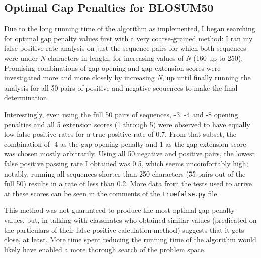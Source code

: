 \documentclass{article}
\begin{document}
\subsection{Optimal Gap Penalties for BLOSUM50}
Due to the long running time of the algorithm as implemented, I began searching for optimal gap penalty values first with a very coarse-grained method: I ran my false positive rate analysis on just the sequence pairs for which both sequences were under {\it N} characters in length, for increasing values of {\it N} (160 up to 250). Promising combinations of gap opening and gap extension scores were investigated more and more closely by increasing {\it N}, up until finally running the analysis for all 50 pairs of positive and negative sequences to make the final determination. 
\par Interestingly, even using the full 50 pairs of sequences, -3, -4 and -8 opening penalties and all 5 extension scores (1 through 5) were observed to have equally low false positive rates for a true positive rate of 0.7. From that subset, the combination of -4 as the gap opening penalty and 1 as the gap extension score was chosen mostly arbitrarily. Using all 50 negative and positive pairs, the lowest false positive passing rate I obtained was 0.5, which seems uncomfortably high; notably, running all sequences shorter than 250 characters (\~35 pairs out of the full 50) results in a rate of less than 0.2. More data from the tests used to arrive at these scores can be seen in the comments of the \verb|truefalse.py| file.
\par This method was not guaranteed to produce the most optimal gap penalty values, but, in talking with classmates who obtained similar values (predicated on the particulars of their false positive calculation method) suggests that it gets close, at least. More time spent reducing the running time of the algorithm would likely have enabled a more thorough search of the problem space.
\end{document}
